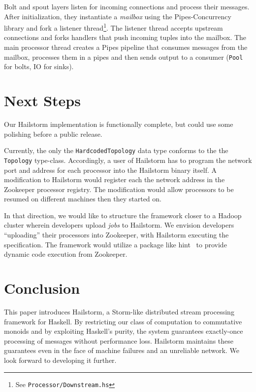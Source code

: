 \documentclass[10pt,nocopyrightspace]{sigplanconf}
\begin{document}
Bolt and spout layers listen for incoming connections and process their
messages. After initialization, they instantiate a \textit{mailbox} using the
Pipes-Concurrency~\cite{pipes-concurrency} library and fork a listener
thread\footnote{See \texttt{Processor/Downstream.hs}}. The listener thread
accepts upstream connections and forks handlers that push incoming tuples
into the mailbox. The main processor thread creates a Pipes pipeline that
consumes messages from the mailbox, processes them in a pipes
and then sends output to a consumer (\lstinline{Pool} for bolts,
IO for sinks).

\section{Next Steps}
Our Hailstorm implementation is functionally complete, but could use some
polishing before a public release.

Currently, the only the \lstinline{HardcodedTopology} data type conforms to the the
\lstinline{Topology} type-class. Accordingly, a user of Hailstorm has to program
the network port and address for each processor into the Hailstorm binary
itself. A modification to Hailstorm would register each the network address
in the Zookeeper processor registry. The modification would allow processors to
be resumed on different machines then they started on.

In that direction, we would like to structure the framework closer to a Hadoop
cluster wherein developers upload \textit{jobs} to Hailstorm. We envision
developers ``uploading'' their processors into Zookeeper, with Hailstorm
executing the specification. The framework would utilize a package like
hint~\cite{hint} to provide dynamic code execution from Zookeeper.

\section{Conclusion}
This paper introduces Hailstorm, a Storm-like distributed stream processing
framework for Haskell. By restricting our class of computation to commutative
monoids and by exploiting Haskell's purity, the system guarantees exactly-once
processing of messages without performance loss. Hailstorm maintains these
guarantees even in the face of machine failures and an unreliable network. We
look forward to developing it further.

{}

\end{document}
